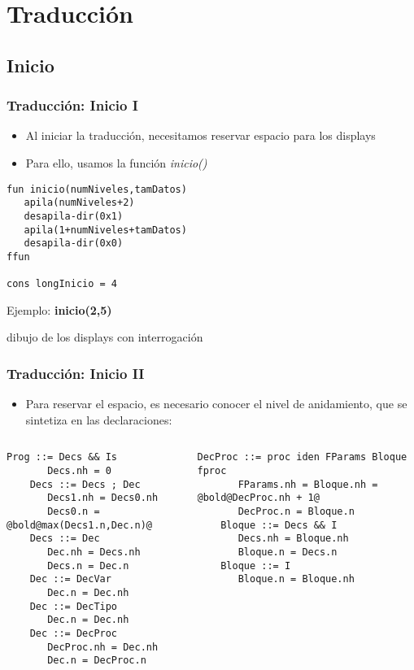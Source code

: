 \documentclass[hyperref={pdfpagelabels=false},tree-dvips,compress]{beamer}
\begin{document}
\section{Traducción}
\subsection{Inicio}
\begin{frame}[fragile]
\frametitle{Traducción: Inicio I}

\begin{itemize}
	\item Al iniciar la traducción, necesitamos reservar espacio para los displays
	\item Para ello, usamos la función \emph{inicio()}
\end{itemize}

\begin{lstlisting}[style=codigoMP,basicstyle=\scriptsize\ttfamily,mathescape]
fun inicio(numNiveles,tamDatos)
   apila(numNiveles+2)
   desapila-dir(0x1)
   apila(1+numNiveles+tamDatos)
   desapila-dir(0x0)
ffun

cons longInicio = 4
\end{lstlisting}

Ejemplo: \textbf{inicio(2,5)}

dibujo de los displays con interrogación

\end{frame}
\begin{frame}[fragile]
\frametitle{Traducción: Inicio II}

\begin{itemize}
	\item Para reservar el espacio, es necesario conocer el nivel de anidamiento, que se sintetiza en las declaraciones:
\end{itemize}

\begin{columns}[T]
	\begin{lstlisting}[style=gramaticas,basicstyle=\scriptsize\ttfamily,mathescape]
	Prog ::= Decs && Is
	   Decs.nh = 0
	Decs ::= Decs ; Dec
	   Decs1.nh = Decs0.nh
	   Decs0.n = @bold@max(Decs1.n,Dec.n)@
	Decs ::= Dec
	   Dec.nh = Decs.nh
	   Decs.n = Dec.n
	Dec ::= DecVar
	   Dec.n = Dec.nh
	Dec ::= DecTipo
	   Dec.n = Dec.nh
	Dec ::= DecProc
	   DecProc.nh = Dec.nh
	   Dec.n = DecProc.n
	\end{lstlisting}

	\begin{lstlisting}[style=gramaticas,basicstyle=\scriptsize\ttfamily,mathescape]
	DecProc ::= proc iden FParams Bloque fproc
	   FParams.nh = Bloque.nh = @bold@DecProc.nh + 1@
	   DecProc.n = Bloque.n
	Bloque ::= Decs && I
	   Decs.nh = Bloque.nh
	   Bloque.n = Decs.n
	Bloque ::= I
	   Bloque.n = Bloque.nh
	\end{lstlisting}
\end{columns}

\end{frame}
\end{document}
